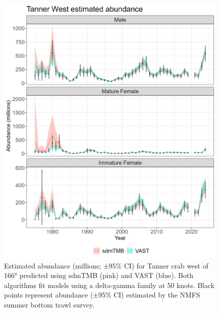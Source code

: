 \documentclass[
]{article}
\begin{document}
\begin{figure}

{\centering \includegraphics[width=1\linewidth,height=1\textheight]{../BAIRDI/Figures/TannerW.abundance.sdmTMBVASTindex} 

}

\caption{Estimated abundance (millions; ±95\% CI) for Tanner crab west of 166° predicted using sdmTMB (pink) and VAST (blue). Both algorithms fit models using a delta-gamma family at 50 knots. Black points represent abundance (±95\% CI) estimated by the NMFS summer bottom trawl survey.}\label{fig:Westbairdi-abund-compare}
\end{figure}
\end{document}
